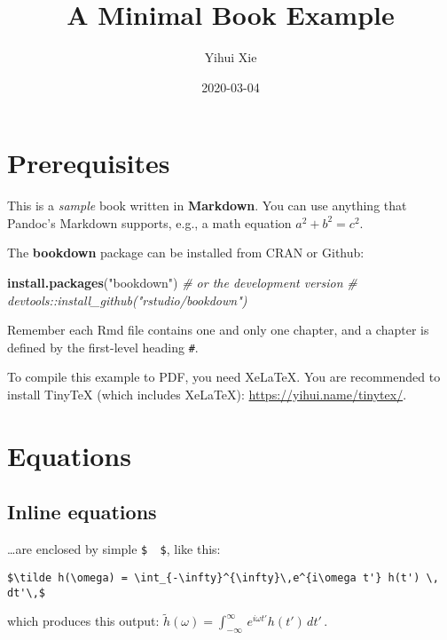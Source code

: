 \documentclass[]{book}
\title{A Minimal Book Example}
\author{Yihui Xie}
\date{2020-03-04}
\newenvironment{Shaded}{\begin{snugshade}}{\end{snugshade}}
\newcommand{\CommentTok}[1]{\textcolor[rgb]{0.56,0.35,0.01}{\textit{#1}}}
\newcommand{\KeywordTok}[1]{\textcolor[rgb]{0.13,0.29,0.53}{\textbf{#1}}}
\newcommand{\NormalTok}[1]{#1}
\newcommand{\StringTok}[1]{\textcolor[rgb]{0.31,0.60,0.02}{#1}}
\begin{document}
\maketitle

{
\setcounter{tocdepth}{1}
\tableofcontents
}
\hypertarget{prerequisites}{%
\chapter{Prerequisites}\label{prerequisites}}

This is a \emph{sample} book written in \textbf{Markdown}. You can use anything that Pandoc's Markdown supports, e.g., a math equation \(a^2 + b^2 = c^2\).

The \textbf{bookdown} package can be installed from CRAN or Github:

\begin{Shaded}
\begin{Highlighting}[]
\KeywordTok{install.packages}\NormalTok{(}\StringTok{"bookdown"}\NormalTok{)}
\CommentTok{# or the development version}
\CommentTok{# devtools::install_github("rstudio/bookdown")}
\end{Highlighting}
\end{Shaded}

Remember each Rmd file contains one and only one chapter, and a chapter is defined by the first-level heading \texttt{\#}.

To compile this example to PDF, you need XeLaTeX. You are recommended to install TinyTeX (which includes XeLaTeX): \url{https://yihui.name/tinytex/}.

\hypertarget{equations}{%
\chapter{Equations}\label{equations}}

\hypertarget{inline-equations}{%
\section{Inline equations}\label{inline-equations}}

\ldots{}are enclosed by simple \texttt{\$\ \ \$}, like this:

\begin{verbatim}
$\tilde h(\omega) = \int_{-\infty}^{\infty}\,e^{i\omega t'} h(t') \, dt'\,$
\end{verbatim}

which produces this output: \(\tilde h(\omega) = \int_{-\infty}^{\infty}\,e^{i\omega t'} h(t') \, dt'\,\).
\end{document}
